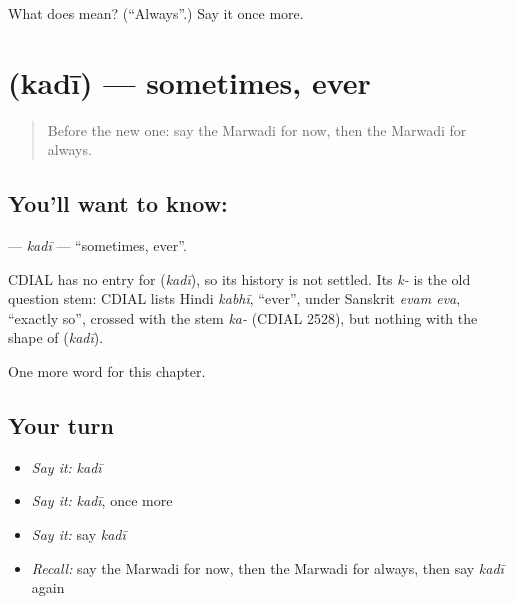 \begin{tcolorbox}[breakable,colback=teal!4,colframe=teal!35!black,title={Before you move on}]
What does  mean? (\textquotedblleft{}Always\textquotedblright{}.) Say it once more.
\end{tcolorbox}
\section[\texorpdfstring{\mw{कदी} (kadī)}{कदी (kadī)}]{ (kadī) — sometimes, ever}

\label{lesson:MW-C80-kadi}



\begin{quote}
Before the new one: say the Marwadi for now, then the Marwadi for always.
\end{quote}

\subsection*{You'll want to know: }
\textbf{} — \emph{kadī} — \textquotedblleft{}sometimes, ever\textquotedblright{}.

\begin{cousinweb}
CDIAL has no entry for \textbf{} (\emph{kadī}), so its history is not settled. Its \emph{k-} is the old question stem: CDIAL lists Hindi \emph{kabhī}, \textquotedblleft{}ever\textquotedblright{}, under Sanskrit \emph{evam eva}, \textquotedblleft{}exactly so\textquotedblright{}, crossed with the stem \emph{ka-} (CDIAL 2528), but nothing with the shape of \textbf{} (\emph{kadī}).
\end{cousinweb}

\begin{grammarlens}[title={What you've built}]
One more word for this chapter.
\end{grammarlens}

\subsection*{Your turn}
\begin{itemize}
\raggedright
  \item \emph{Say it:} \emph{kadī}
  \item \emph{Say it:} \emph{kadī}, once more
  \item \emph{Say it:} say \emph{kadī}
  \item \emph{Recall:} say the Marwadi for now, then the Marwadi for always, then say \emph{kadī} again
\end{itemize}

